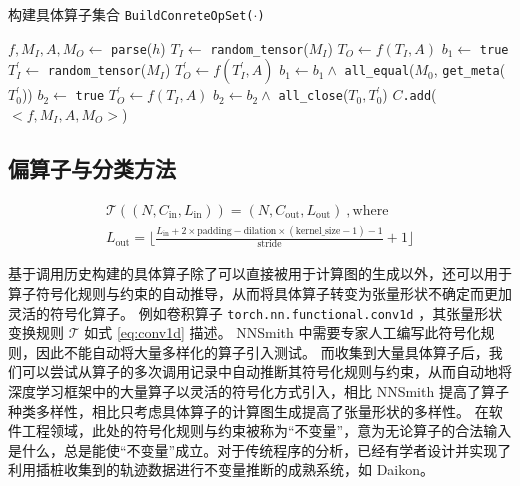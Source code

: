 \begin{algorithm}
    \caption{构建具体算子集合 \texttt{BuildConreteOpSet($\cdot$)}}
    \label{algo:build_copset}

 {
    $f, M_I, A, M_O \gets$ \texttt{parse}($h$) 
    $T_I \gets$ \texttt{random\_tensor}($M_I$) 
    $T_O \gets f(T_I, A)$ 
     {
        $b_1 \gets$ \texttt{true} \label{algo:build_copset:meq:s}\;
         {
            $T_I^{'} \gets$ \texttt{random\_tensor}($M_I$)\;
            $T_O^{'} \gets f(T_I^{'}, A)$\;
            $b_1 \gets b_1 \wedge$ \texttt{all\_equal}($M_0$, \texttt{get\_meta}($T_0^{'}$))\;
        }
         {\Continue} \label{algo:build_copset:meq:e}
        $b_2 \gets$ \texttt{true} \label{algo:build_copset:tclose:s} \;
         {
            $T_O^{'} \gets f(T_I, A)$\;
            $b_2 \gets b_2 \wedge$ \texttt{all\_close}($T_0, T_0^{'}$)\;
        }
         {\Continue} \label{algo:build_copset:tclose:e}
        $C$\texttt{.add}($<f, M_I, A, M_O>$)\;
    }
}
\end{algorithm}

\subsection{偏算子与分类方法}

\begin{equation}
\label{eq:conv1d}
\begin{gathered}
\mathcal{T}((N, C_\text{in}, L_\text{in})) = 
(N, C_\text{out}, L_\text{out}) ~, \text{where} \\
L_\text{out} =
\lfloor \frac{L_\text{in} + 2 \times \text{padding} - \text{dilation} \times (\text{kernel\_size} - 1) - 1}{\text{stride}} + 1 \rfloor
\end{gathered}
\end{equation}


基于调用历史构建的具体算子除了可以直接被用于计算图的生成以外，还可以用于算子符号化规则与约束的自动推导，从而将具体算子转变为张量形状不确定而更加灵活的符号化算子。
例如卷积算子 \texttt{torch.nn.functional.conv1d} ，其张量形状变换规则 $\mathcal{T}$ 如式 \eqref{eq:conv1d} 描述\cite{torch_conv1d}。
NNSmith 中需要专家人工编写此符号化规则，因此不能自动将大量多样化的算子引入测试。
而收集到大量具体算子后，我们可以尝试从算子的多次调用记录中自动推断其符号化规则与约束，从而自动地将深度学习框架中的大量算子以灵活的符号化方式引入，相比 NNSmith 提高了算子种类多样性，相比只考虑具体算子的计算图生成提高了张量形状的多样性。
在软件工程领域，此处的符号化规则与约束被称为“不变量”，意为无论算子的合法输入是什么，总是能使“不变量”成立。对于传统程序的分析，已经有学者设计并实现了利用插桩收集到的轨迹数据进行不变量推断的成熟系统，如 Daikon\cite{daikon}。

